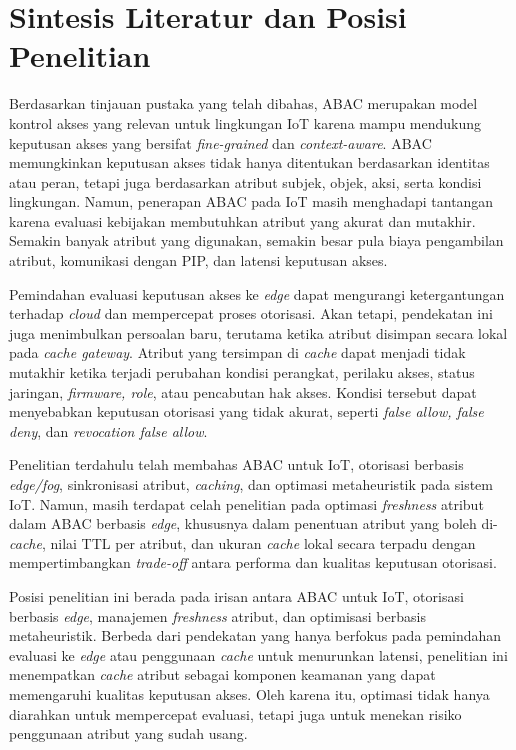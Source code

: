 \section{Sintesis Literatur dan Posisi Penelitian}

Berdasarkan tinjauan pustaka yang telah dibahas, ABAC merupakan model kontrol akses yang relevan untuk lingkungan IoT karena mampu mendukung keputusan akses yang bersifat \textit{fine-grained} dan \textit{context-aware}. ABAC memungkinkan keputusan akses tidak hanya ditentukan berdasarkan identitas atau peran, tetapi juga berdasarkan atribut subjek, objek, aksi, serta kondisi lingkungan. Namun, penerapan ABAC pada IoT masih menghadapi tantangan karena evaluasi kebijakan membutuhkan atribut yang akurat dan mutakhir. Semakin banyak atribut yang digunakan, semakin besar pula biaya pengambilan atribut, komunikasi dengan PIP, dan latensi keputusan akses.

Pemindahan evaluasi keputusan akses ke \textit{edge} dapat mengurangi ketergantungan terhadap \textit{cloud} dan mempercepat proses otorisasi. Akan tetapi, pendekatan ini juga menimbulkan persoalan baru, terutama ketika atribut disimpan secara lokal pada \textit{cache gateway}. Atribut yang tersimpan di \textit{cache} dapat menjadi tidak mutakhir ketika terjadi perubahan kondisi perangkat, perilaku akses, status jaringan, \textit{firmware, role}, atau pencabutan hak akses. Kondisi tersebut dapat menyebabkan keputusan otorisasi yang tidak akurat, seperti \textit{false allow, false deny}, dan \textit{revocation false allow}.

Penelitian terdahulu telah membahas ABAC untuk IoT, otorisasi berbasis \textit{edge/fog}, sinkronisasi atribut, \textit{caching}, dan optimasi metaheuristik pada sistem IoT. Namun, masih terdapat celah penelitian pada optimasi \textit{freshness} atribut dalam ABAC berbasis \textit{edge}, khususnya dalam penentuan atribut yang boleh di-\textit{cache}, nilai TTL per atribut, dan ukuran \textit{cache} lokal secara terpadu dengan mempertimbangkan \textit{trade-off} antara performa dan kualitas keputusan otorisasi.

Posisi penelitian ini berada pada irisan antara ABAC untuk IoT, otorisasi berbasis \textit{edge}, manajemen \textit{freshness} atribut, dan optimisasi berbasis metaheuristik. Berbeda dari pendekatan yang hanya berfokus pada pemindahan evaluasi ke \textit{edge} atau penggunaan \textit{cache} untuk menurunkan latensi, penelitian ini menempatkan \textit{cache} atribut sebagai komponen keamanan yang dapat memengaruhi kualitas keputusan akses. Oleh karena itu, optimasi tidak hanya diarahkan untuk mempercepat evaluasi, tetapi juga untuk menekan risiko penggunaan atribut yang sudah usang.

